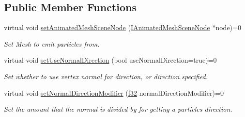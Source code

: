 \subsection*{Public Member Functions}
\begin{DoxyCompactItemize}
\item 
\mbox{\label{classirr_1_1scene_1_1IParticleAnimatedMeshSceneNodeEmitter_aea7018c57995b67aaf86db6df5bf6967}} 
virtual void \hyperlink{classirr_1_1scene_1_1IParticleAnimatedMeshSceneNodeEmitter_aea7018c57995b67aaf86db6df5bf6967}{set\+Animated\+Mesh\+Scene\+Node} (\hyperlink{classirr_1_1scene_1_1IAnimatedMeshSceneNode}{I\+Animated\+Mesh\+Scene\+Node} $\ast$node)=0
\begin{DoxyCompactList}\small\item\em Set Mesh to emit particles from. \end{DoxyCompactList}\item 
\mbox{\label{classirr_1_1scene_1_1IParticleAnimatedMeshSceneNodeEmitter_a2ce1db214df2ce15444e10460a06859a}} 
virtual void \hyperlink{classirr_1_1scene_1_1IParticleAnimatedMeshSceneNodeEmitter_a2ce1db214df2ce15444e10460a06859a}{set\+Use\+Normal\+Direction} (bool use\+Normal\+Direction=true)=0
\begin{DoxyCompactList}\small\item\em Set whether to use vertex normal for direction, or direction specified. \end{DoxyCompactList}\item 
\mbox{\label{classirr_1_1scene_1_1IParticleAnimatedMeshSceneNodeEmitter_a0f7da6d0e149de9169091b3a144632e8}} 
virtual void \hyperlink{classirr_1_1scene_1_1IParticleAnimatedMeshSceneNodeEmitter_a0f7da6d0e149de9169091b3a144632e8}{set\+Normal\+Direction\+Modifier} (\hyperlink{namespaceirr_a0277be98d67dc26ff93b1a6a1d086b07}{f32} normal\+Direction\+Modifier)=0
\begin{DoxyCompactList}\small\item\em Set the amount that the normal is divided by for getting a particles direction. \end{DoxyCompactList}\item 
\mbox{\label{classirr_1_1scene_1_1IParticleAnimatedMeshSceneNodeEmitter_adfb1ff0bef8f6a86be81f928f5d27784}} 

\end{DoxyCompactItemize}
